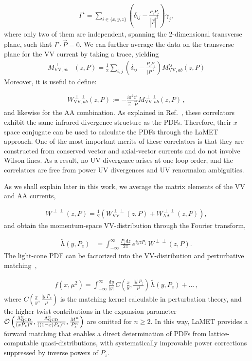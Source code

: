 \documentclass[floatfix,twocolumn,prl,showpacs,preprintnumbers,amsmath,nofootinbib,amssymb,noeprint,superscriptaddress]{revtex4-1}
\newcommand{\dd}{\mathrm{d}}
\begin{document}
\begin{align}
    \Gamma^i=\sum_{i\in\{x,y,z\}}\left(\delta_{ij}-\frac{P_i P_j}{|\vec{P}|^2}\right)\gamma_j,
    \label{eq:transverse_proj}
\end{align}
%
where only two of them are independent, spanning the 2-dimensional transverse plane, such that $\Gamma\cdot \vec{P}=0$. We can further average the data on the transverse plane for the VV current by taking a trace, yielding
\begin{align}
M^{\perp\perp}_{\mathrm{VV},ab}&(z,P)
=\frac{1}{2}\sum_{i,j} \left(\delta_{ij}-\frac{P_iP_j}{|P|^2}\right)
M_{\mathrm{VV},ab}^{ij}(z,P)
\label{eq:Wperp}
\end{align}
%
Moreover, it is useful to define:

\begin{align}
    W^{\perp\perp}_{\mathrm{VV},ab}(z,P) 
    := 
    -\frac{i\pi^2 z^4}{\vec{z}\cdot\vec{P}}
    M^{\perp\perp}_{\mathrm{VV},ab}(z,P) \,,
    \label{eq:Wdef}
\end{align}
%
and likewise for the AA combination.   As explained in Ref.~\cite{Ma:2014jla}, these correlators exhibit the same infrared divergence structure as the PDFs. 
Therefore, their $x$-space conjugate can be used to calculate the PDFs through the LaMET approach. 
One of the most important merits of these correlators is that they are constructed from conserved vector and axial-vector currents and do not involve Wilson lines. As a result, no UV divergence arises at one-loop order, and the correlators are free from power UV divergences and UV renormalon ambiguities.

As we shall explain later in this work, we average the matrix elements of the VV and AA currents,

\begin{align}
    W^{\perp\perp}(z,P)=\frac{1}{2}\left(	W^{\perp\perp}_{\mathrm{VV}}(z,P)+	W^{\perp\perp}_{\mathrm{AA}}(z,P)\right),
    \label{eq:VVAA-combo}
\end{align}
%
and obtain the momentum-space VV-distribution through the Fourier transform,

\begin{align}
\tilde{h}(y,P_z)
&=
\int_{-\infty}^\infty \frac{P_z\dd z}{2\pi}\,
e^{i y zP_z}\,
W^{\perp\perp}\!\left(z,P\right).
\end{align}
The light-cone PDF can be factorized into the VV-distribution and perturbative matching~\cite{Ji:2024oka},

\begin{align}
\label{eq:lm_expansion}
f(x,\mu^2)
=
\int_{-\infty}^{\infty} \frac{\dd y}{|y|}\,
C\!\left(\frac{x}{y},\frac{|y|P_z}{\mu}\right)
\, \tilde{h}(y,P_z)
+ ...\, ,
\end{align}
%
where $C\!\left(\frac{x}{y},\frac{|y|P_z}{\mu}\right)$ is the matching kernel calculable in
perturbation theory, and the higher twist contributions in the expansion parameter $\mathcal{O}\left(\frac{\Lambda^n_{\rm QCD}}{(xP_z)^n},\frac{\Lambda^n_{\rm QCD}}{((1-x)P_z)^n},\frac{M^n}{P_z^n}\right)$ are omitted for $n\geq2$. In this way, LaMET provides a forward matching
that enables a direct determination of PDFs from lattice-computable
quasi-distributions, with systematically improvable power corrections suppressed by inverse powers of $P_z$.
\end{document}
